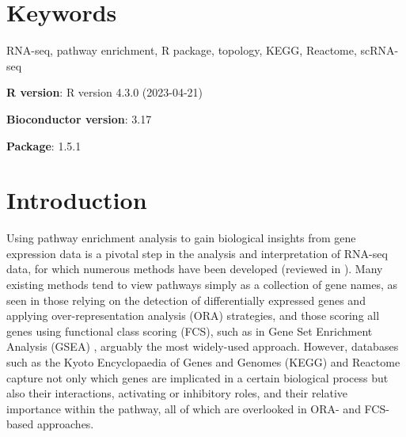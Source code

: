 \documentclass[9pt,a4paper,]{extarticle}
\begin{document}
\section*{Keywords}
RNA-seq, pathway enrichment, R package, topology, KEGG, Reactome, scRNA-seq


\clearpage
\pagestyle{main}

\textbf{R version}: R version 4.3.0 (2023-04-21)

\textbf{Bioconductor version}: 3.17

\textbf{Package}: 1.5.1

\hypertarget{introduction}{%
\section{Introduction}\label{introduction}}

Using pathway enrichment analysis to gain biological insights from gene expression data is a pivotal step in the analysis and interpretation of RNA-seq data, for which numerous methods have been developed (reviewed in \citep{Maleki2020-ur, Mubeen2022-eq}).
Many existing methods tend to view pathways simply as a collection of gene names, as seen in those relying on the detection of differentially expressed genes and applying over-representation analysis (ORA) strategies, and those scoring all genes using functional class scoring (FCS), such as in Gene Set Enrichment Analysis (GSEA) \citep{Subramanian2005-lx}, arguably the most widely-used approach.
However, databases such as the Kyoto Encyclopaedia of Genes and Genomes (KEGG)\citep{OgataKEGGKyotoEncyclopediaa} and Reactome\citep{reactome2021} capture not only which genes are implicated in a certain biological process but also their interactions, activating or inhibitory roles, and their relative importance within the pathway, all of which are overlooked in ORA- and FCS-based approaches.
\end{document}
